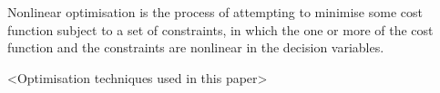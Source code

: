 {\color{red} Nonlinear optimisation is the process of attempting to minimise some cost function subject to a set of constraints, in which the one or more of the cost function and the constraints are nonlinear in the decision variables.

<Optimisation techniques used in this paper>}